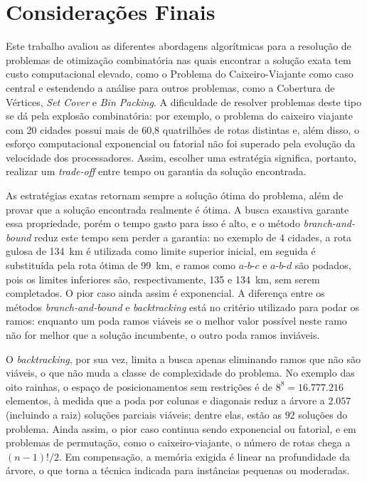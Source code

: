 
\chapter*[Considerações Finais]{Considerações Finais}

Este trabalho avaliou as diferentes abordagens algorítmicas para a resolução de problemas de otimização combinatória nas quais encontrar a solução exata tem custo computacional elevado, como o Problema do Caixeiro-Viajante como caso central e estendendo a análise para outros problemas, como a Cobertura de Vértices, \textit{Set Cover} e \textit{Bin Packing}. A dificuldade de resolver problemas deste tipo se dá pela explosão combinatória: por exemplo, o problema do caixeiro viajante com 20 cidades possui mais de 60,8 quatrilhões de rotas distintas e, além disso, o esforço computacional exponencial ou fatorial não foi superado pela evolução da velocidade dos processadores. Assim, escolher uma estratégia significa, portanto, realizar um \textit{trade-off} entre tempo ou garantia da solução encontrada.

As estratégias exatas retornam sempre a solução ótima do problema, além de provar que a solução encontrada realmente é ótima. A busca exaustiva garante essa propriedade, porém o tempo gasto para isso é alto, e o método \textit{branch-and-bound} reduz este tempo sem perder a garantia: no exemplo de 4 cidades, a rota gulosa de 134~km é utilizada como limite superior inicial, em seguida é substituída pela rota ótima de 99~km, e ramos como $a\text{-}b\text{-}c$ e $a\text{-}b\text{-}d$ são podados, pois os limites inferiores são, respectivamente, 135 e 134~km, sem serem completados. O pior caso ainda assim é exponencial. A diferença entre os métodos \textit{branch-and-bound} e \textit{backtracking} está no critério utilizado para podar os ramos: enquanto um poda ramos viáveis se o melhor valor possível neste ramo não for melhor que a solução incumbente, o outro poda ramos inviáveis.

O \textit{backtracking}, por sua vez, limita a busca apenas eliminando ramos que não são viáveis, o que não muda a classe de complexidade do problema. No exemplo das oito rainhas, o espaço de posicionamentos sem restrições é de $8^8 = 16.777.216$ elementos, à medida que a poda por colunas e diagonais reduz a árvore a $2.057$ (incluindo a raiz) soluções parciais viáveis; dentre elas, estão as $92$ soluções do problema. Ainda assim, o pior caso continua sendo exponencial ou fatorial, e em problemas de permutação, como o caixeiro-viajante, o número de rotas chega a $(n - 1)!/2$. Em compensação, a memória exigida é linear na profundidade da árvore, o que torna a técnica indicada para instâncias pequenas ou moderadas.

